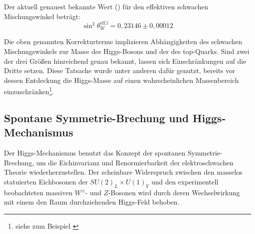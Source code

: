Der aktuell genauest bekannte Wert (\cite{PhysRevD.86.010001}) für den
effektiven schwachen Mischungswinkel beträgt:
\begin{equation}
    \sin^2\theta_W^\text{eff,l} = 0,23146 \pm 0,00012
    \label{eq:literature_value}
\end{equation}

Die oben genannten Korrekturterme implizieren Abhängigkeiten des schwachen
Mischungswinkels zur Masse des Higgs-Bosons und der des top-Quarks. Sind zwei
der drei Größen hinreichend genau bekannt, lassen sich Einschränkungen auf die
Dritte setzen. Diese Tatsache wurde unter anderen dafür genutzt, bereits vor
dessen Entdeckung die Higgs-Masse auf einen wahrscheinlichen Massenbereich
einzuschränken\footnote{siehe zum Beispiel \cite{Baur:1996zi}}. 



\subsection{Spontane Symmetrie-Brechung und Higgs-Mechanismus}
\label{theory:higgs}
Der Higgs-Mechanismus benutzt das Konzept der spontanen Symmetrie-Brechung, um
die Eichinvarianz und Renormierbarkeit der elektroschwachen Theorie
wiederherzustellen. Der scheinbare Widerspruch zwischen den masselos
statuierten Eichbosonen der $SU(2)_L \times U(1)_Y$ und den experimentell
beobachteten massiven $W^\pm$- und $Z$-Bosonen wird durch deren Wechselwirkung
mit einem den Raum durchziehenden Higgs-Feld behoben.

